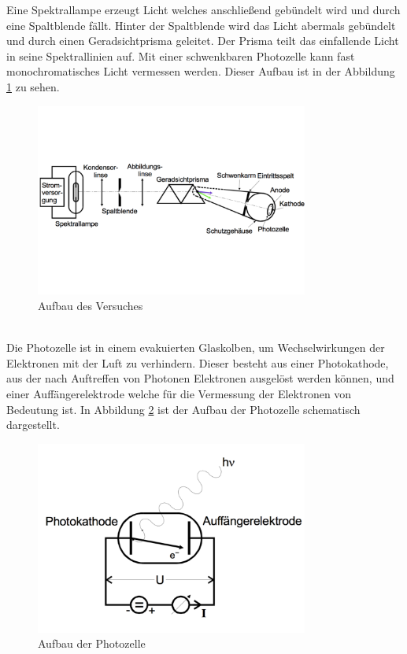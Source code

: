 Eine Spektrallampe erzeugt Licht welches anschließend gebündelt wird und durch eine Spaltblende fällt. Hinter der Spaltblende wird das Licht abermals gebündelt und durch einen Geradsichtprisma geleitet. Der Prisma teilt das einfallende Licht in seine Spektrallinien auf. Mit einer schwenkbaren Photozelle kann fast monochromatisches Licht vermessen werden. Dieser Aufbau ist in der Abbildung \ref{fig:500-3} zu sehen.
\begin{figure}[h!]
  \centering
  \includegraphics[width=0.8\textwidth]{500-3.pdf}
  \caption{Aufbau des Versuches \cite{1}}
  \label{fig:500-3}
\end{figure}
\\Die Photozelle ist in einem evakuierten Glaskolben, um Wechselwirkungen der Elektronen mit der Luft zu verhindern. Dieser besteht aus einer Photokathode, aus der nach Auftreffen von Photonen Elektronen ausgelöst werden können, und einer Auffängerelektrode welche für die Vermessung der Elektronen von Bedeutung ist. In Abbildung \ref{fig:500-1} ist der Aufbau der Photozelle schematisch dargestellt.
\begin{figure}[h!]
  \centering
  \includegraphics[width=0.8\textwidth]{500-1.pdf}
  \caption{Aufbau der Photozelle \cite{1}}
  \label{fig:500-1}
\end{figure}
